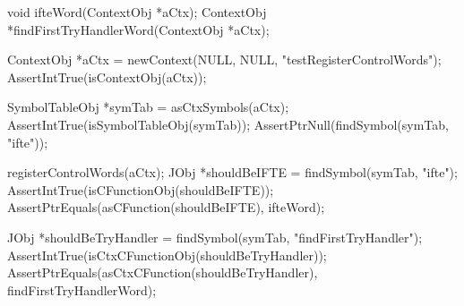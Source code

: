 
\startCHeader
void ifteWord(ContextObj *aCtx);
ContextObj *findFirstTryHandlerWord(ContextObj *aCtx);
\stopCHeader

\startCTest
  ContextObj *aCtx = newContext(NULL, NULL, "testRegisterControlWords");
  AssertIntTrue(isContextObj(aCtx));
  
  SymbolTableObj *symTab = asCtxSymbols(aCtx);
  AssertIntTrue(isSymbolTableObj(symTab));
  AssertPtrNull(findSymbol(symTab, "ifte"));
  
  registerControlWords(aCtx);
  JObj *shouldBeIFTE = findSymbol(symTab, "ifte");
  AssertIntTrue(isCFunctionObj(shouldBeIFTE));
  AssertPtrEquals(asCFunction(shouldBeIFTE), ifteWord);
  
  JObj *shouldBeTryHandler = findSymbol(symTab, "findFirstTryHandler");
  AssertIntTrue(isCtxCFunctionObj(shouldBeTryHandler));
  AssertPtrEquals(asCtxCFunction(shouldBeTryHandler), findFirstTryHandlerWord);
\stopCTest
\stopTestCase
\stopTestSuite